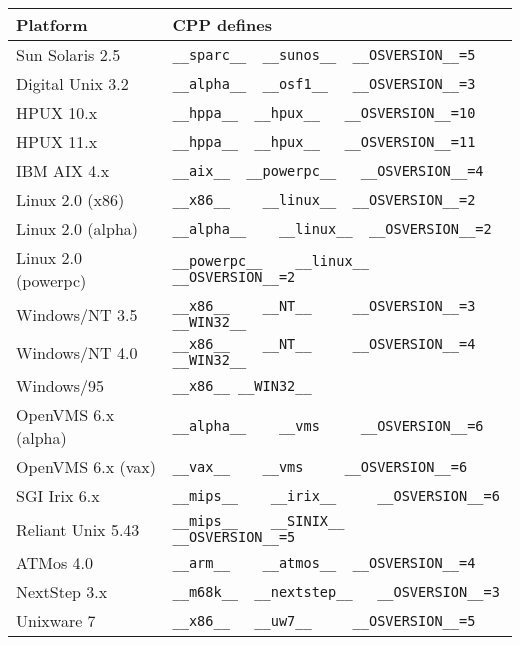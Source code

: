 \documentclass[twoside,11pt,onecolumn]{book}
\begin{document}
\pagestyle{empty}
\setcounter{secnumdepth}{3}
\setcounter{tocdepth}{3}
{\newpage
\clearpage
\samepage \begin{tabular}{|l|l|}
\hline
Platform & CPP defines \\ 
\hline
Sun Solaris 2.5  & \verb|__sparc__  __sunos__  __OSVERSION__=5| \\ 
\hline
Digital Unix 3.2 & \verb|__alpha__  __osf1__   __OSVERSION__=3| \\ 
\hline
HPUX 10.x & \verb|__hppa__  __hpux__   __OSVERSION__=10| \\ 
\hline
HPUX 11.x & \verb|__hppa__  __hpux__   __OSVERSION__=11| \\ 
\hline
IBM AIX 4.x & \verb|__aix__  __powerpc__   __OSVERSION__=4| \\ 
\hline
Linux 2.0 (x86)  & \verb|__x86__    __linux__  __OSVERSION__=2| \\ 
\hline
Linux 2.0 (alpha)  & \verb|__alpha__    __linux__  __OSVERSION__=2| \\ 
\hline
Linux 2.0 (powerpc) & \verb|__powerpc__    __linux__  __OSVERSION__=2| \\ 
\hline
Windows/NT 3.5   & \verb|__x86__    __NT__     __OSVERSION__=3  __WIN32__| \\ 
\hline
Windows/NT 4.0   & \verb|__x86__    __NT__     __OSVERSION__=4  __WIN32__| \\ 
\hline
Windows/95   & \verb|__x86__ __WIN32__| \\ 
\hline
OpenVMS 6.x (alpha) & \verb|__alpha__    __vms     __OSVERSION__=6 | \\ 
\hline
OpenVMS 6.x (vax)   & \verb|__vax__    __vms     __OSVERSION__=6 | \\ 
\hline
SGI Irix 6.x & \verb|__mips__    __irix__     __OSVERSION__=6 | \\ 
\hline
Reliant Unix 5.43 & \verb|__mips__    __SINIX__     __OSVERSION__=5 | \\ 
\hline
ATMos 4.0        & \verb|__arm__    __atmos__  __OSVERSION__=4| \\ 
\hline
NextStep 3.x & \verb|__m68k__  __nextstep__   __OSVERSION__=3| \\ 
\hline
Unixware 7 & \verb|__x86__   __uw7__     __OSVERSION__=5| \\ 
\hline
\end{tabular}
}
\end{document}
